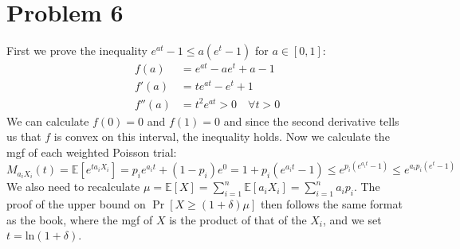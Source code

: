 \documentclass[11pt]{article}
\newcommand{\E}{\mathbb{E}}
\newcommand{\p}[1]{\left(#1\right)}
\renewcommand{\ln}[1]{\text{ln}\p{#1}}
\newcommand{\asdf}{\newline\newline}
\begin{document}
\section*{Problem 6}
First we prove the inequality $e^{at}-1\leq a(e^t-1)$ for $a\in[0,1]$: \begin{align*}
f(a) &= e^{at}-ae^t+a-1\\
f'(a) &= te^{at}-e^t+1\\
f''(a) &= t^2e^{at} > 0 \quad \forall t>0
\end{align*}
We can calculate $f(0)=0$ and $f(1)=0$ and since the second derivative tells us that $f$ is convex on this interval, the inequality holds.\asdf
Now we calculate the mgf of each weighted Poisson trial: $$M_{a_iX_i}(t) = \E[e^{ta_iX_i}] = p_ie^{a_it}+(1-p_i)e^0 = 1+p_i(e^{a_it}-1) \leq e^{p_i(e^{a_it}-1)} \leq e^{a_ip_i(e^t-1)}$$ We also need to recalculate $\mu=\E[X]=\sum_{i=1}^n \E[a_iX_i] = \sum_{i=1}^n a_ip_i$. The proof of the upper bound on $\Pr[X\geq (1+\delta)\mu]$ then follows the same format as the book, where the mgf of $X$ is the product of that of the $X_i$, and we set $t=\ln{1+\delta}$.
\end{document}
